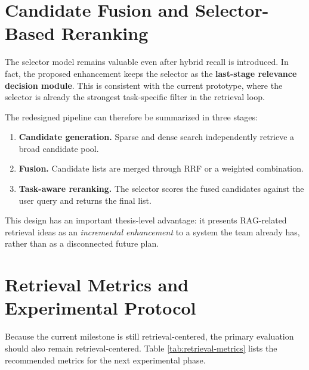 \documentclass[11pt,a4paper,oneside]{report}
\begin{document}
\section{Candidate Fusion and Selector-Based Reranking}

The selector model remains valuable even after hybrid recall is introduced. In fact,
the proposed enhancement keeps the selector as the \textbf{last-stage relevance
decision module}. This is consistent with the current prototype, where the selector is
already the strongest task-specific filter in the retrieval loop.

The redesigned pipeline can therefore be summarized in three stages:

\begin{enumerate}
  \item \textbf{Candidate generation.} Sparse and dense search independently retrieve a
  broad candidate pool.
  \item \textbf{Fusion.} Candidate lists are merged through RRF or a weighted combination.
  \item \textbf{Task-aware reranking.} The selector scores the fused candidates against the
  user query and returns the final list.
\end{enumerate}

This design has an important thesis-level advantage: it presents RAG-related retrieval
ideas as an \emph{incremental enhancement} to a system the team already has, rather than
as a disconnected future plan.

\section{Retrieval Metrics and Experimental Protocol}

Because the current milestone is still retrieval-centered, the primary evaluation
should also remain retrieval-centered. Table \ref{tab:retrieval-metrics} lists the
recommended metrics for the next experimental phase.
\end{document}
